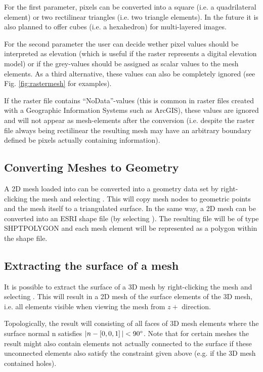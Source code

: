 For the first parameter, pixels can be converted into a square (i.e. a quadrilateral element) or two rectilinear triangles (i.e. two triangle elements). In the future it is also planned to offer cubes (i.e. a hexahedron) for multi-layered images.

For the second parameter the user can decide wether pixel values should be interpreted as elevation (which is useful if the raster represents a digital elevation model) or if the grey-values should be assigned as scalar values to the mesh elements. As a third alternative, these values can also be completely ignored (see Fig. \ref{fig:rastermesh} for examples).

If the raster file contains ``NoData''-values (this is common in raster files created with a Geographic Information Systems such as ArcGIS), these values are ignored and will not appear as mesh-elements after the conversion  (i.e. despite the raster file always being rectilinear the resulting mesh may have an arbitrary boundary defined be pixels actually containing information).

\subsection{Converting Meshes to Geometry}

A 2D mesh loaded into \ogs can be converted into a geometry data set by right-clicking the mesh and selecting . This will copy mesh nodes to geometric points and the mesh itself to a triangulated surface. In the same way, a 2D mesh can be converted into an ESRI shape file (by selecting ). The resulting file will be of type SHPT\textunderscore POLYGON and each mesh element will be represented as a polygon within the shape file.

\subsection{Extracting the surface of a mesh}

It is possible to extract the surface of a 3D mesh by right-clicking the mesh and selecting . This will result in a 2D mesh of the surface elements of the 3D mesh, i.e. all elements visible when viewing the mesh from $z+$ direction.

Topologically, the result will consisting of all faces of 3D mesh elements where the surface normal n satisfies $|n - \left[0, 0, 1\right]|<90^\circ$. Note that for certain meshes the result might also contain elements not actually connected to the surface if these unconnected elements also satisfy the constraint given above (e.g. if the 3D mesh contained holes).



